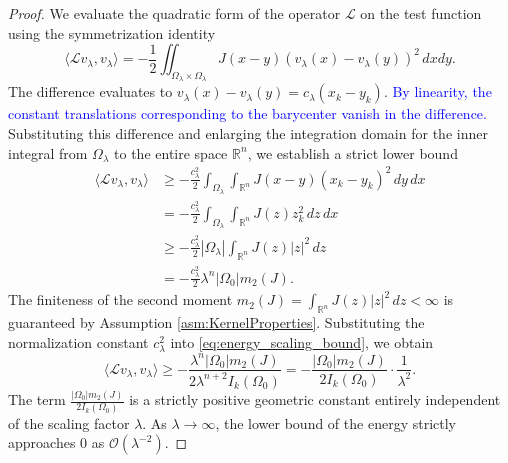 \documentclass[12pt, a4paper]{article}
\newcommand{\revision}[1]{\textcolor{blue}{#1}}
\theoremstyle{break}
\theoremstyle{break}
\theoremstyle{break}
\theoremstyle{break}
\theoremstyle{break}
\theoremstyle{break}
\theoremstyle{break}
\theoremstyle{break}
\theoremstyle{break}
\begin{document}
\begin{proof}
    We evaluate the quadratic form of the operator $\mathcal{L}$ on the test function using the symmetrization identity
    \begin{equation}
        \langle \mathcal{L}v_\lambda, v_\lambda \rangle = -\frac{1}{2} \iint_{\Omega_\lambda \times \Omega_\lambda} J(x-y) (v_\lambda(x) - v_\lambda(y))^2 \, dx dy.
    \end{equation}
    The difference evaluates to $v_\lambda(x) - v_\lambda(y) = c_\lambda(x_k - y_k)$. \revision{By linearity, the constant translations corresponding to the barycenter vanish in the difference.} Substituting this difference and enlarging the integration domain for the inner integral from $\Omega_\lambda$ to the entire space $\mathbb{R}^n$, we establish a strict lower bound
    \begin{align} \label{eq:energy_scaling_bound}
        \langle \mathcal{L}v_\lambda, v_\lambda \rangle &\geq -\frac{c_\lambda^2}{2} \int_{\Omega_\lambda} \int_{\mathbb{R}^n} J(x-y) (x_k - y_k)^2 \, dy \, dx \nonumber \\
        &= -\frac{c_\lambda^2}{2} \int_{\Omega_\lambda} \int_{\mathbb{R}^n} J(z) z_k^2 \, dz \, dx \nonumber \\
        &\geq -\frac{c_\lambda^2}{2} |\Omega_\lambda| \int_{\mathbb{R}^n} J(z) |z|^2 \, dz \nonumber \\
        &= -\frac{c_\lambda^2}{2} \lambda^n |\Omega_0| m_2(J).
    \end{align}
    The finiteness of the second moment $m_2(J) = \int_{\mathbb{R}^n} J(z) |z|^2 \, dz < \infty$ is guaranteed by Assumption \ref{asm:KernelProperties}. Substituting the normalization constant $c_\lambda^2$ into \eqref{eq:energy_scaling_bound}, we obtain
    \begin{equation}
        \langle \mathcal{L}v_\lambda, v_\lambda \rangle \geq -\frac{\lambda^n |\Omega_0| m_2(J)}{2 \lambda^{n+2} I_k(\Omega_0)} = -\frac{|\Omega_0| m_2(J)}{2 I_k(\Omega_0)} \cdot \frac{1}{\lambda^2}.
    \end{equation}
    The term $\frac{|\Omega_0| m_2(J)}{2 I_k(\Omega_0)}$ is a strictly positive geometric constant entirely independent of the scaling factor $\lambda$. As $\lambda \to \infty$, the lower bound of the energy strictly approaches $0$ as $\mathcal{O}(\lambda^{-2})$. 
    

\end{proof}
\end{document}
